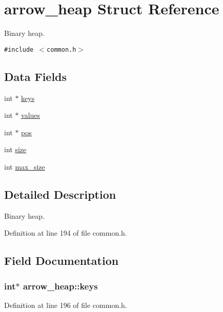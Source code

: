 \hypertarget{structarrow__heap}{
\section{arrow\_\-heap Struct Reference}
\label{structarrow__heap}
}
Binary heap.  


{\tt \#include $<$common.h$>$}

\subsection*{Data Fields}
\begin{CompactItemize}
\item 
int $\ast$ \hyperlink{structarrow__heap_663da189690098d1ad1bbc04701402f2}{keys}
\item 
int $\ast$ \hyperlink{structarrow__heap_e2641f7a933ecb92d32acd3a50caa442}{values}
\item 
int $\ast$ \hyperlink{structarrow__heap_a39c7b18964b26c78a96f51406d8d7ab}{pos}
\item 
int \hyperlink{structarrow__heap_afeff09d63b1f6ec6fc910d3407972de}{size}
\item 
int \hyperlink{structarrow__heap_e668dd3f450ba07df5998b8d084e6949}{max\_\-size}
\end{CompactItemize}


\subsection{Detailed Description}
Binary heap. 

Definition at line 194 of file common.h.

\subsection{Field Documentation}
\hypertarget{structarrow__heap_663da189690098d1ad1bbc04701402f2}{
\subsubsection[{keys}]{\setlength{\rightskip}{0pt plus 5cm}int$\ast$ {\bf arrow\_\-heap::keys}}}
\label{structarrow__heap_663da189690098d1ad1bbc04701402f2}




Definition at line 196 of file common.h.

